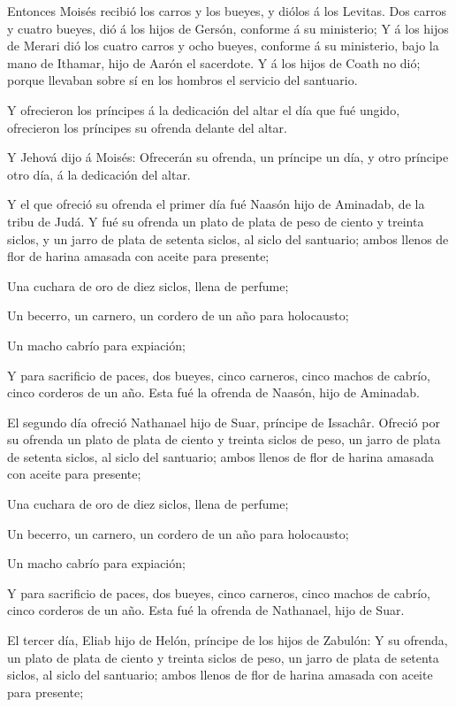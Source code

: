  Entonces Moisés recibió los carros y los bueyes, y diólos á
los Levitas.  Dos carros y cuatro bueyes, dió á los hijos de
Gersón, conforme á su ministerio;  Y á los hijos de Merari
dió los cuatro carros y ocho bueyes, conforme á su ministerio, bajo la
mano de Ithamar, hijo de Aarón el sacerdote.  Y á los hijos
de Coath no dió; porque llevaban sobre sí en los hombros el servicio del
santuario.

 Y ofrecieron los príncipes á la dedicación del altar el
día que fué ungido, ofrecieron los príncipes su ofrenda delante del
altar.

 Y Jehová dijo á Moisés: Ofrecerán su ofrenda, un príncipe
un día, y otro príncipe otro día, á la dedicación del altar.

 Y el que ofreció su ofrenda el primer día fué Naasón hijo
de Aminadab, de la tribu de Judá.  Y fué su ofrenda un
plato de plata de peso de ciento y treinta siclos, y un jarro de plata
de setenta siclos, al siclo del santuario; ambos llenos de flor de
harina amasada con aceite para presente;

 Una cuchara de oro de diez siclos, llena de perfume;

 Un becerro, un carnero, un cordero de un año para
holocausto;

 Un macho cabrío para expiación;

 Y para sacrificio de paces, dos bueyes, cinco carneros,
cinco machos de cabrío, cinco corderos de un año. Esta fué la ofrenda de
Naasón, hijo de Aminadab.

 El segundo día ofreció Nathanael hijo de Suar, príncipe de
Issachâr.  Ofreció por su ofrenda un plato de plata de
ciento y treinta siclos de peso, un jarro de plata de setenta siclos, al
siclo del santuario; ambos llenos de flor de harina amasada con aceite
para presente;

 Una cuchara de oro de diez siclos, llena de perfume;

 Un becerro, un carnero, un cordero de un año para
holocausto;

 Un macho cabrío para expiación;

 Y para sacrificio de paces, dos bueyes, cinco carneros,
cinco machos de cabrío, cinco corderos de un año. Esta fué la ofrenda de
Nathanael, hijo de Suar.

 El tercer día, Eliab hijo de Helón, príncipe de los hijos
de Zabulón:  Y su ofrenda, un plato de plata de ciento y
treinta siclos de peso, un jarro de plata de setenta siclos, al siclo
del santuario; ambos llenos de flor de harina amasada con aceite para
presente;


